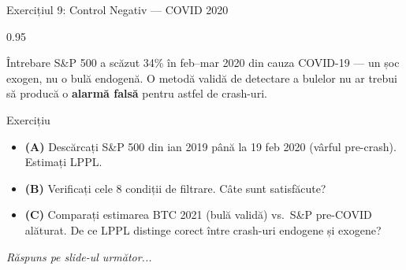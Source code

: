 \documentclass[9pt, aspectratio=169, t]{beamer}
\begin{document}
\begin{frame}{Exercițiul 9: Control Negativ --- COVID 2020}
    \begin{cminipage}{0.95\textwidth}
    \begin{alertblock}{Întrebare}
        S\&P 500 a scăzut 34\% în feb--mar 2020 din cauza COVID-19 --- un șoc exogen, nu o bulă endogenă.
        O metodă validă de detectare a bulelor nu ar trebui să producă o \textbf{alarmă falsă} pentru astfel de crash-uri.
    \end{alertblock}

    \vspace{0.15cm}

    \begin{block}{Exercițiu}
        \begin{itemize}\setlength{\itemsep}{3pt}
            \item \textcolor{MainBlue}{\textbf{(A)}} Descărcați S\&P 500 din ian 2019 până la 19 feb 2020 (vârful pre-crash). Estimați LPPL.
            \item \textcolor{MainBlue}{\textbf{(B)}} Verificați cele 8 condiții de filtrare. Câte sunt satisfăcute?
            \item \textcolor{MainBlue}{\textbf{(C)}} Comparați estimarea BTC 2021 (bulă validă) vs.\ S\&P pre-COVID alăturat. De ce LPPL distinge corect între crash-uri endogene și exogene?
        \end{itemize}
    \end{block}

    \vspace{0.1cm}

    \begin{center}
        \textit{Răspuns pe slide-ul următor...}
    \end{center}
    \end{cminipage}
\end{frame}
\end{document}
